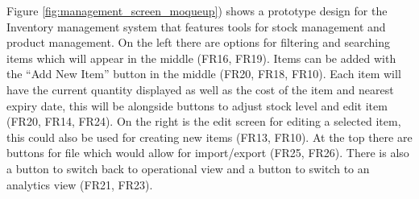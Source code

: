 Figure \ref{fig:management_screen_moqueup}) shows a prototype design for the Inventory management system that features tools for stock management and product management. On the left there are options for filtering and searching items which will appear in the middle (FR16, FR19). Items can be added with the “Add New Item” button in the middle (FR20, FR18, FR10). Each item will have the current quantity displayed as well as the cost of the item and nearest expiry date, this will be alongside buttons to adjust stock level and edit item (FR20, FR14, FR24). On the right is the edit screen for editing a selected item, this could also be used for creating new items (FR13, FR10). At the top there are buttons for file which would allow for import/export (FR25, FR26). There is also a button to switch back to operational view and a button to switch to an analytics view (FR21, FR23).